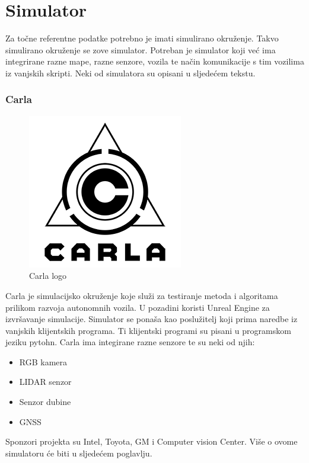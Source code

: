\section{Simulator}

Za točne referentne podatke potrebno je imati simulirano okruženje. Takvo simulirano okruženje se zove simulator. Potreban je simulator koji već ima integrirane razne mape, razne senzore, vozila te način komunikacije s tim vozilima iz vanjskih skripti. Neki od simulatora su opisani u sljedećem tekstu.

\subsubsection{Carla}
\begin{figure}[ht!]
  \centering
  \includegraphics[scale=0.5]{images/carla_logo.png}
  \caption{Carla logo}
\end{figure}

Carla je simulacijsko okruženje koje služi za testiranje metoda i algoritama prilikom razvoja autonomnih vozila. U pozadini koristi Unreal Engine za izvršavanje simulacije. Simulator se ponaša kao poslužitelj koji prima naredbe iz vanjskih klijentskih programa. Ti klijentski programi su pisani u programskom jeziku pytohn.
Carla ima integirane razne senzore te su neki od njih:
\begin{itemize}
  \item RGB kamera
  \item LIDAR senzor
  \item Senzor dubine
  \item GNSS
\end{itemize}

Sponzori projekta su Intel, Toyota, GM i Computer vision Center. Više o ovome simulatoru će biti u sljedećem poglavlju.


